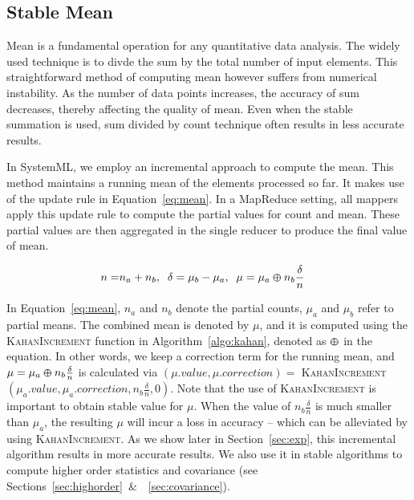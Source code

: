 \subsection{Stable Mean}
\label{sec:mean}

Mean is a fundamental operation for any quantitative data analysis. The widely used technique is to divde the sum by the total number of input elements. %
This straightforward method of computing mean however suffers from numerical instability. As the number of data points increases, the accuracy of sum decreases, thereby affecting the quality of mean. Even when the stable summation is used, sum divided by count technique often results in less accurate results. 

In SystemML, we employ an incremental approach to compute the mean. This method maintains a running mean of the elements processed so far. It makes use of the update rule in Equation~\ref{eq:mean}. In a MapReduce setting, all mappers apply this update rule to compute the partial values for count and mean. These partial values are then aggregated in the single reducer to produce the final value of mean.

\begin{small}
\begin{equation}
\begin{split}
n=& n_a+n_b, \;\; \delta=\mu_b-\mu_a, \;\; \mu=\mu_a\varoplus n_b\frac{\delta}{n}
\end{split}
\label{eq:mean}
\end{equation}
\end{small}

In Equation~\ref{eq:mean}, $n_a$ and $n_b$ denote the partial counts, $\mu_a$ and $\mu_b$ refer to partial means. The combined mean is denoted by $\mu$, and it is computed using the \textsc{KahanIncrement} function in Algorithm~\ref{algo:kahan}, denoted as $\varoplus$ in the equation. In other words, we keep a correction term for the running mean, and $\mu=\mu_a\varoplus n_b\frac{\delta}{n}$ is calculated via $(\mu.value, \mu.correction)=$ \textsc{KahanIncrement} $(\mu_a.value, \mu_a.correction, n_b\frac{\delta}{n}, 0)$. Note that the use of \textsc{KahanIncrement} is important to obtain stable value for $\mu$. When the value of $n_b\frac{\delta}{n}$ is much smaller than $\mu_a$, the resulting $\mu$ will incur a loss in accuracy -- which can be alleviated by using \textsc{KahanIncrement}. As we show later in Section~\ref{sec:exp}, this incremental algorithm results in more accurate results. We also use it in stable algorithms to compute higher order statistics and covariance (see Sections~\ref{sec:highorder}~\&~~\ref{sec:covariance}).

